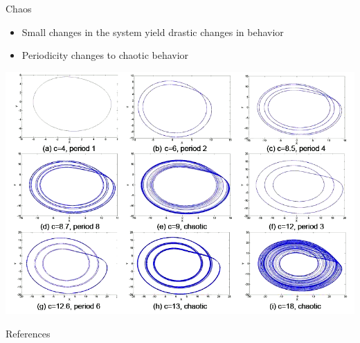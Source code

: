 \documentclass{beamer}
\begin{document}
\begin{frame}{Chaos}
	\begin{itemize}
		\item Small changes in the system yield drastic changes in behavior
		\pause
		\item Periodicity changes to chaotic behavior
	\end{itemize}
	\pause
	\begin{center}
		\includegraphics[scale=0.3]{varying_c}
	\end{center}
\end{frame}

\begin{frame}{References}
	\nocite{*}
	
	
\end{frame}
\end{document}
